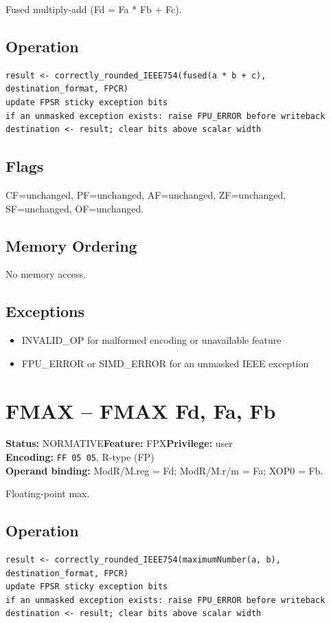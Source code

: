 \documentclass[10pt]{article}
\begin{document}
Fused multiply-add (Fd = Fa * Fb + Fc).

\subsection*{Operation}
\begin{lstlisting}
result <- correctly_rounded_IEEE754(fused(a * b + c), destination_format, FPCR)
update FPSR sticky exception bits
if an unmasked exception exists: raise FPU_ERROR before writeback
destination <- result; clear bits above scalar width
\end{lstlisting}
\subsection*{Flags}
CF=unchanged, PF=unchanged, AF=unchanged, ZF=unchanged, SF=unchanged, OF=unchanged.
\subsection*{Memory Ordering}
No memory access.
\subsection*{Exceptions}
\begin{itemize}
\item INVALID\_OP for malformed encoding or unavailable feature
\item FPU\_ERROR or SIMD\_ERROR for an unmasked IEEE exception
\end{itemize}
\clearpage

\section{FMAX -- FMAX Fd, Fa, Fb}
\textbf{Status:} NORMATIVE\quad \textbf{Feature:} FPX\quad \textbf{Privilege:} user\\
\textbf{Encoding:} \texttt{FF 05 05}, R-type (FP)\\
\textbf{Operand binding:} ModR/M.reg = Fd; ModR/M.r/m = Fa; XOP0 = Fb.

Floating-point max.

\subsection*{Operation}
\begin{lstlisting}
result <- correctly_rounded_IEEE754(maximumNumber(a, b), destination_format, FPCR)
update FPSR sticky exception bits
if an unmasked exception exists: raise FPU_ERROR before writeback
destination <- result; clear bits above scalar width
\end{lstlisting}
\end{document}

